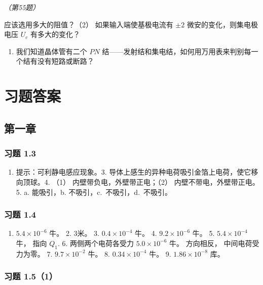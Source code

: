 \emph{（第55题）}

应该选用多大的阻值？（2） 如果输入端使基极电流有 \(\pm2\)
微安的变化，则集电极电压 \(U_{c}\) 有多大的变化？

\begin{enumerate}
\def\labelenumi{\arabic{enumi}.}
\setcounter{enumi}{55}
\tightlist
\item
  我们知道晶体管有二个 \(PN\)
  结------发射结和集电结，如何用万用表来判别每一个结有没有短路或断路？
\end{enumerate}

\chapter{习题答案}\label{ux4e60ux9898ux7b54ux6848}

\section{第一章}\label{ux7b2cux4e00ux7ae0}

\subsection{习题 1.3}\label{ux4e60ux9898-1.3-1}

\begin{enumerate}
\def\labelenumi{\arabic{enumi}.}
\tightlist
\item
  提示：可利静电感应现象。3.
  导体上感生的异种电荷吸引金箔上电荷，使它移向顶球。4. （1）
  内壁带负电，外壁带正电；（2） 内壁不带电，外壁带正电。5. a. 能吸引，b.
  不吸引，c.~不吸引，d.~不吸引。
\end{enumerate}

\subsection{习题 1.4}\label{ux4e60ux9898-1.4-1}

\begin{enumerate}
\def\labelenumi{\arabic{enumi}.}
\tightlist
\item
  \(5.4 \times 10^{-6}\) 牛。 2. 3米。 3. \(0.4 \times 10^{-4}\) 牛。 4.
  \(9.2 \times 10^{-6}\) 牛。 5. \(5.4 \times 10^{-4}\) 牛， 指向
  \(Q_{1}\). 6. 两侧两个电荷各受力 \(5.0 \times 10^{-6}\) 牛。
  方向相反， 中间电荷受力为零。 7. \(9.7 \times 10^{-2}\) 牛。 8.
  \(0.34 \times 10^{-4}\) 牛。 9. \(1.86 \times 10^{-8}\) 库。
\end{enumerate}

\subsection{习题 1.5（1）}\label{ux4e60ux9898-1.51-1}

